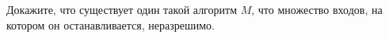 Докажите, что существует один такой алгоритм $M$, что множество входов, на котором он останавливается, неразрешимо.